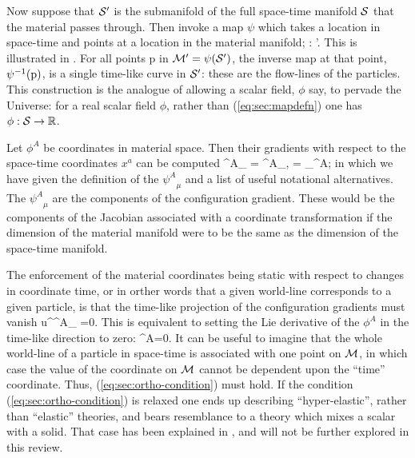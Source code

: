  Now suppose that  $\mathcal{S}'$ is the submanifold of the full space-time manifold $\mathcal{S}$ that the material passes through. Then invoke a map $\psi$ which takes a location in space-time and points at a location in the material manifold;
\bea
\label{eq:sec:mapdefn}
\psi : \stmanif'\longrightarrow \matmanif.
\eea
This is illustrated in .
For all points p in $\mathcal{M}' = \psi(\mathcal{S}')$, the inverse map at that point, $\psi^{-1}({\rm p})$, is a single time-like curve in $\mathcal{S}'$: these are the flow-lines of the particles. This construction is the analogue of allowing a scalar field, $\phi$ say, to pervade the Universe: for a real scalar field $\phi$, rather than (\ref{eq:sec:mapdefn}) one has $\phi : \mathcal{S}\rightarrow \mathbb{R}$.



Let $\phi^A$ be   coordinates in material space. Then their gradients with respect to the space-time coordinates $x^a$ can be computed
\bea
\label{eq:sec:config_gradient}
{\psi^A}_{\mu}  {} = {\phi^A}_{,\mu} = \partial_{\mu}\phi^A;
\eea
in which we have given the definition of the ${\psi^A}_{\mu}$ and a list of useful notational alternatives.
The ${\psi^A}_{\mu}$ are   the components of the configuration gradient. These would be the components of the Jacobian associated with a coordinate transformation if the dimension of the material manifold were to be the same as the dimension of the space-time manifold. 

The enforcement of  the material coordinates being static with respect to changes in coordinate time, or in orther words that a given world-line corresponds to a given particle, is that the time-like projection of the configuration gradients must vanish
\bea
\label{eq:sec:ortho-condition}
u^{\mu}{\psi^A}_{\mu} =0.
\eea
This is equivalent to setting the Lie derivative of the $\phi^A$ in the time-like direction to zero:
\bea
{}\phi^A=0.
\eea
It can be useful to imagine that the whole world-line of a particle in space-time is associated with one point on $\mathcal{M}$, in which case the value of the coordinate on $\mathcal{M}$ cannot be dependent upon the ``time'' coordinate. Thus, (\ref{eq:sec:ortho-condition}) must hold.
If the condition (\ref{eq:sec:ortho-condition}) is relaxed one ends up describing ``hyper-elastic'', rather than ``elastic'' theories, and bears resemblance to a theory which mixes a scalar with a solid. That case has been explained  in \cite{Carter:2006cw}, and will not be further explored in this review.

